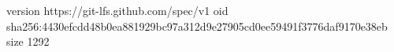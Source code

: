 version https://git-lfs.github.com/spec/v1
oid sha256:4430efcdd48b0ea881929bc97a312d9e27905cd0ee59491f3776daf9170e38eb
size 1292
